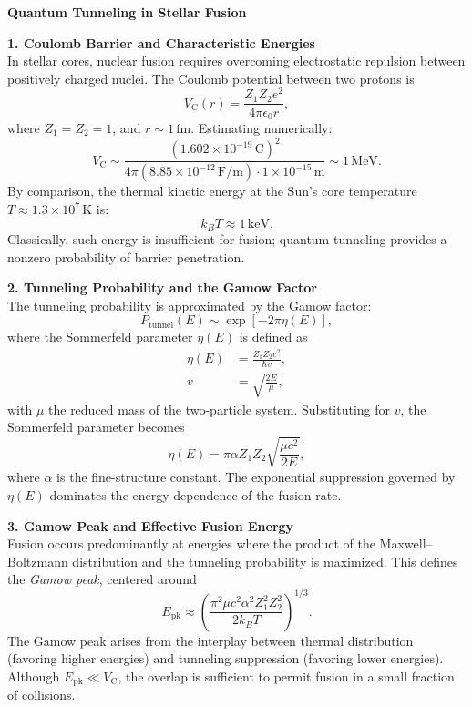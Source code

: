 \begin{technical}
{\Large\textbf{Quantum Tunneling in Stellar Fusion}}

\textbf{1. Coulomb Barrier and Characteristic Energies}\\[0.5em]
In stellar cores, nuclear fusion requires overcoming electrostatic repulsion between positively charged nuclei. The Coulomb potential between two protons is
\[
V_\text{C}(r) = \frac{Z_1 Z_2 e^2}{4\pi \epsilon_0 r},
\]
where \( Z_1 = Z_2 = 1 \), and \( r \sim 1\,\text{fm} \). Estimating numerically:
\[
V_\text{C} \sim \frac{(1.602 \times 10^{-19}\,\text{C})^2}{4\pi (8.85 \times 10^{-12}\,\text{F/m}) \cdot 1 \times 10^{-15}\,\text{m}} \sim 1\,\text{MeV}.
\]
By comparison, the thermal kinetic energy at the Sun’s core temperature \( T \approx 1.3 \times 10^7\,\text{K} \) is:
\[
k_B T \approx 1\,\text{keV}.
\]
Classically, such energy is insufficient for fusion; quantum tunneling provides a nonzero probability of barrier penetration.

\vspace{0.7em}
\textbf{2. Tunneling Probability and the Gamow Factor}\\[0.5em]
The tunneling probability is approximated by the Gamow factor:
\[
P_\text{tunnel}(E) \sim \exp\left[-2\pi \eta(E)\right],
\]
where the Sommerfeld parameter \(\eta(E)\) is defined as
\begin{align*}
\eta(E) &= \frac{Z_1 Z_2 e^2}{\hbar v}, \\
v &= \sqrt{\frac{2E}{\mu}},
\end{align*}
with \(\mu\) the reduced mass of the two-particle system. Substituting for \(v\), the Sommerfeld parameter becomes
\[
\eta(E) = \pi \alpha Z_1 Z_2 \sqrt{\frac{\mu c^2}{2E}},
\]
where \(\alpha\) is the fine-structure constant. The exponential suppression governed by \(\eta(E)\) dominates the energy dependence of the fusion rate.

\vspace{0.7em}
\textbf{3. Gamow Peak and Effective Fusion Energy}\\[0.5em]
Fusion occurs predominantly at energies where the product of the Maxwell–Boltzmann distribution and the tunneling probability is maximized. This defines the \emph{Gamow peak}, centered around
\[
E_\text{pk} \approx \left( \frac{\pi^2 \mu c^2 \alpha^2 Z_1^2 Z_2^2}{2 k_B T} \right)^{1/3}.
\]
The Gamow peak arises from the interplay between thermal distribution (favoring higher energies) and tunneling suppression (favoring lower energies). Although \( E_\text{pk} \ll V_\text{C} \), the overlap is sufficient to permit fusion in a small fraction of collisions.


\end{technical}
